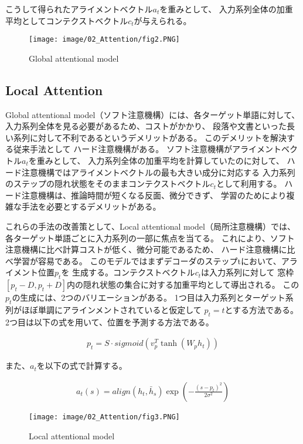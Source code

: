 \documentclass{jsarticle}
\begin{document}
こうして得られたアライメントベクトル$a_t$を重みとして、
入力系列全体の加重平均としてコンテクストベクトル$c_t$が与えられる。


\begin{figure}[H]
  \begin{center}
    \texttt{[image: image/02\_Attention/fig2.PNG]}
    \caption{Global attentional model}
    \label{fig:fig2}
  \end{center}
\end{figure}


\subsection{Local Attention}
Global attentional model（ソフト注意機構）には、各ターゲット単語に対して、
入力系列全体を見る必要があるため、コストがかかり、
段落や文書といった長い系列に対して不利であるというデメリットがある。
このデメリットを解決する従来手法として
ハード注意機構がある。
ソフト注意機構がアライメントベクトル$a_t$を重みとして、
入力系列全体の加重平均を計算していたのに対して、
ハード注意機構ではアライメントベクトルの最も大きい成分に対応する
入力系列のステップの隠れ状態をそのままコンテクストベクトル$c_t$として利用する。
ハード注意機構は、推論時間が短くなる反面、微分できず、
学習のためにより複雑な手法を必要とするデメリットがある。

これらの手法の改善策として、Local attentional model（局所注意機構）では、
各ターゲット単語ごとに入力系列の一部に焦点を当てる。
これにより、ソフト注意機構に比べ計算コストが低く、微分可能であるため、
ハード注意機構に比べ学習が容易である。
このモデルではまずデコーダのステップtにおいて、アライメント位置$p_t$を
生成する。コンテクストベクトル$c_t$は入力系列に対して
窓枠$[p_t-D,p_t+D]$内の隠れ状態の集合に対する加重平均として導出される。
この$p_t$の生成には、2つのバリエーションがある。
1つ目は入力系列とターゲット系列がほぼ単調にアラインメントされていると仮定して
$p_t=t$とする方法である。
2つ目は以下の式を用いて、位置を予測する方法である。

\begin{eqnarray}
  p_t = S\cdot sigmoid (v_p^T \tanh(W_p h_t))
\end{eqnarray}

また、$a_t$を以下の式で計算する。

\begin{eqnarray}
  a_t(s) = align(h_t,\bar h_s)\exp(-\frac{(s-p_t)^2}{2\sigma^2})
\end{eqnarray}


\begin{figure}[H]
  \begin{center}
    \texttt{[image: image/02\_Attention/fig3.PNG]}
    \caption{Local attentional model}
    \label{fig:fig3}
  \end{center}
\end{figure}
\end{document}
